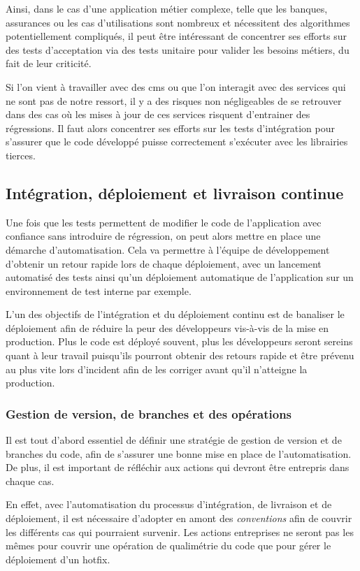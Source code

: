 Ainsi, dans le cas d'une application métier complexe, telle que les banques, assurances ou les cas d'utilisations sont nombreux et nécessitent des algorithmes potentiellement compliqués, il peut être intéressant de concentrer ses efforts sur des tests d'acceptation via des tests unitaire pour valider les besoins métiers, du fait de leur criticité.

Si l'on vient à travailler avec des \gls{cms} ou que l'on interagit avec des services qui ne sont pas de notre ressort, il y a des risques non négligeables de se retrouver dans des cas où les mises à jour de ces services risquent d'entrainer des régressions. Il faut alors concentrer ses efforts sur les tests d'intégration pour s'assurer que le code développé puisse correctement s'exécuter avec les librairies tierces.

\subsection{Intégration, déploiement et livraison continue}

Une fois que les tests permettent de modifier le code de l'application avec confiance sans introduire de régression, on peut alors mettre en place une démarche d'automatisation. Cela va permettre à l'équipe de développement d'obtenir un retour rapide lors de chaque déploiement, avec un lancement automatisé des tests ainsi qu'un déploiement automatique de l'application sur un environnement de test interne par exemple.

L'un des objectifs de l'intégration et du déploiement continu est de banaliser le déploiement afin de réduire la peur des développeurs vis-à-vis de la mise en production. Plus le code est déployé souvent, plus les développeurs seront sereins quant à leur travail puisqu'ils pourront obtenir des retours rapide et être prévenu au plus vite lors d'incident afin de les corriger avant qu'il n'atteigne la production.

\subsubsection{Gestion de version, de branches et des opérations}

Il est tout d'abord essentiel de définir une stratégie de gestion de version et de branches du code, afin de s'assurer une bonne mise en place de l'automatisation. De plus, il est important de réfléchir aux actions qui devront être entrepris dans chaque cas. 

En effet, avec l'automatisation du processus d'intégration, de livraison et de déploiement, il est nécessaire d'adopter en amont des \emph{conventions} afin de couvrir les différents cas qui pourraient survenir. Les actions entreprises ne seront pas les mêmes pour couvrir une opération de qualimétrie du code que pour gérer le déploiement d'un \gls{hotfix}.

